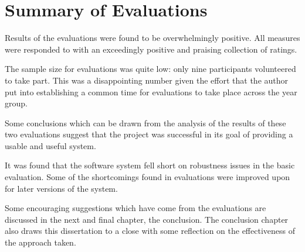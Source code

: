 \section{Summary of Evaluations}
Results of the evaluations were found to be overwhelmingly positive.  All measures were responded to with an exceedingly positive and praising collection of ratings.  

The sample size for evaluations was quite low: only nine participants volunteered to take part.  This was a disappointing number given the effort that the author put into establishing a common time for evaluations to take place across the year group.

Some conclusions which can be drawn from the analysis of the results of these two evaluations suggest that the project was successful in its goal of providing a usable and useful system.  

It was found that the software system fell short on robustness issues in the basic evaluation. Some of the shortcomings found in evaluations were improved upon for later versions of the system.

Some encouraging suggestions which have come from the evaluations are discussed in the next and final chapter, the conclusion.  The conclusion chapter also draws this dissertation to a close with some reflection on the effectiveness of the approach taken.
